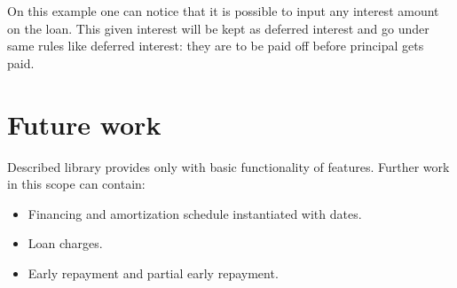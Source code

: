 \documentclass[letterpaper,11pt]{article}
\begin{document}
On this example one can notice that it is possible to input any interest amount on the loan.
This given interest will be kept as deferred interest and go under same rules like deferred
interest: they are to be paid off before principal gets paid.

\section {Future work}

Described library provides only with basic functionality of features. Further work in this scope can contain:

\begin {itemize}
\item Financing and amortization schedule instantiated with dates.
\item Loan charges.
\item Early repayment and partial early repayment.
\end {itemize}
\end{document}
